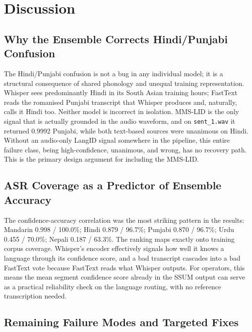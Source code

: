 \documentclass[conference]{IEEEtran}
\begin{document}
\section{Discussion}

\subsection{Why the Ensemble Corrects Hindi/Punjabi Confusion}

The Hindi/Punjabi confusion is not a bug in any individual model; it is a structural consequence of shared phonology and unequal training representation. Whisper sees predominantly Hindi in its South Asian training hours; FastText reads the romanised Punjabi transcript that Whisper produces and, naturally, calls it Hindi too. Neither model is incorrect in isolation. MMS-LID is the only signal that is actually grounded in the audio waveform, and on \texttt{sent\_1.wav} it returned 0.9992 Punjabi, while both text-based sources were unanimous on Hindi. Without an audio-only LangID signal somewhere in the pipeline, this entire failure class, being high-confidence, unanimous, and wrong, has no recovery path. This is the primary design argument for including the MMS-LID.

\subsection{ASR Coverage as a Predictor of Ensemble Accuracy}

The confidence-accuracy correlation was the most striking pattern in the results: Mandarin 0.998 / 100.0\%; Hindi 0.879 / 96.7\%; Punjabi 0.870 / 96.7\%; Urdu 0.455 / 70.0\%; Nepali 0.187 / 63.3\%. The ranking maps exactly onto training corpus coverage. Whisper's encoder effectively signals how well it knows a language through its confidence score, and a bad transcript cascades into a bad FastText vote because FastText reads what Whisper outputs. For operators, this means the mean segment confidence score already in the SSUM output can serve as a practical reliability check on the language routing, with no reference transcription needed.

\subsection{Remaining Failure Modes and Targeted Fixes}
\label{sec:gurmukhi}
\end{document}
